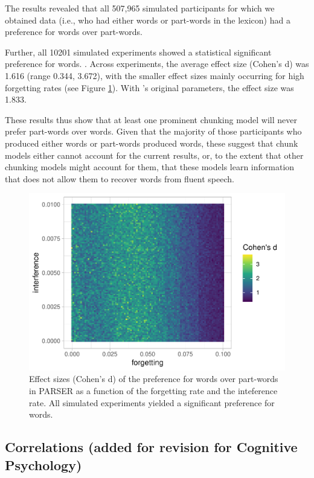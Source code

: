 \documentclass[
]{article}
\begin{document}
The results revealed that all 507,965 simulated participants for which
we obtained data (i.e., who had either words or part-words in the
lexicon) had a preference for words over part-words.

Further, all 10201 simulated experiments showed a statistical
significant preference for words. . Across experiments, the average
effect size (Cohen's d) was 1.616 (range 0.344, 3.672), with the smaller
effect sizes mainly occurring for high forgetting rates (see Figure
\ref{fig:parser-plot-d}). With \citep{Perruchet1998}'s original
parameters, the effect size was 1.833.

These results thus show that at least one prominent chunking model will
never prefer part-words over words. Given that the majority of those
participants who produced either words or part-words produced words,
these suggest that chunk models either cannot account for the current
results, or, to the extent that other chunking models might account for
them, that these models learn information that does not allow them to
recover words from fluent speech.

\begin{figure}

{\centering \includegraphics[width=0.8\linewidth]{segmentation_recall_combined_for_revision2_files/figure-latex/parser-plot-d-1} 

}

\caption{Effect sizes (Cohen's d) of the preference for words over part-words in PARSER as a function of the forgetting rate and the inteference rate. All simulated experiments yielded a significant preference for words.}\label{fig:parser-plot-d}
\end{figure}

\clearpage

\hypertarget{correlations-added-for-revision-for-cognitive-psychology}{%
\subsection{Correlations (added for revision for Cognitive
Psychology)}\label{correlations-added-for-revision-for-cognitive-psychology}}
\end{document}

